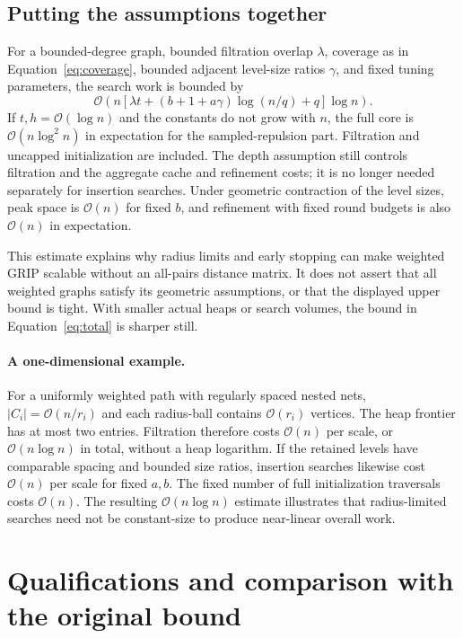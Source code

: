 \documentclass[11pt,a4paper]{article}
\newcommand{\bigO}{\mathcal O}
\begin{document}
\subsection{Putting the assumptions together}

For a bounded-degree graph, bounded filtration overlap $\lambda$, coverage
as in Equation~\eqref{eq:coverage}, bounded adjacent level-size ratios
$\gamma$, and fixed tuning parameters, the search work is bounded by
\begin{equation}
 \bigO\!\left(n[\lambda t+(b+1+a\gamma)\log(n/q)+q]\log n\right).
 \label{eq:conditional}
\end{equation}
If $t,h=\bigO(\log n)$ and the constants do not grow with $n$, the full core is
$\bigO(n\log^2 n)$ in expectation for the sampled-repulsion part. Filtration
and uncapped initialization are included. The depth assumption still controls
filtration and the aggregate cache and refinement costs; it is no longer
needed separately for insertion searches. Under geometric contraction of the
level sizes, peak space is $\bigO(n)$ for fixed $b$, and refinement with fixed
round budgets is also $\bigO(n)$ in expectation.

This estimate explains why radius limits and early stopping can make weighted
GRIP scalable without an all-pairs distance matrix. It does not assert that
all weighted graphs satisfy its geometric assumptions, or that the displayed
upper bound is tight. With smaller actual heaps or search volumes, the bound
in Equation~\eqref{eq:total} is sharper still.

\paragraph{A one-dimensional example.}
For a uniformly weighted path with regularly spaced nested nets,
$|C_i|=\bigO(n/r_i)$ and each radius-ball contains $\bigO(r_i)$ vertices. The
heap frontier has at most two entries. Filtration therefore costs $\bigO(n)$
per scale, or $\bigO(n\log n)$ in total, without a heap logarithm. If the
retained levels have comparable spacing and bounded size ratios, insertion
searches likewise cost $\bigO(n)$ per scale for fixed $a,b$. The fixed number
of full initialization traversals costs $\bigO(n)$. The resulting
$\bigO(n\log n)$ estimate illustrates that radius-limited searches need not
be constant-size to produce near-linear overall work.

\clearpage
\section{Qualifications and comparison with the original bound}
\end{document}
